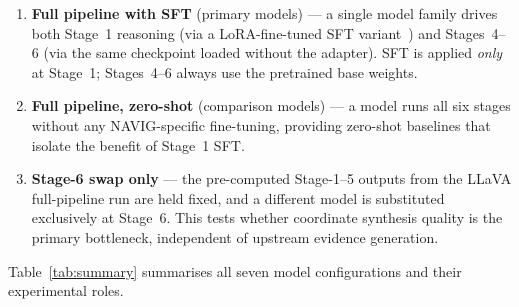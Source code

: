 \documentclass[11pt]{article}
\begin{document}
\begin{enumerate}[noitemsep]
  \item \textbf{Full pipeline with SFT} (primary models) --- a single model family drives
    both Stage~1 reasoning (via a LoRA-fine-tuned SFT variant~\citep{Hu2022LoRA}) and
    Stages~4--6 (via the same checkpoint loaded without the adapter). SFT is applied
    \emph{only} at Stage~1; Stages~4--6 always use the pretrained base weights.
  \item \textbf{Full pipeline, zero-shot} (comparison models) --- a model runs all six
    stages without any NAVIG-specific fine-tuning, providing zero-shot baselines that
    isolate the benefit of Stage~1 SFT.
  \item \textbf{Stage-6 swap only} --- the pre-computed Stage-1--5 outputs from the LLaVA
    full-pipeline run are held fixed, and a different model is substituted exclusively at
    Stage~6. This tests whether coordinate synthesis quality is the primary bottleneck,
    independent of upstream evidence generation.
\end{enumerate}

Table~\ref{tab:summary} summarises all seven model configurations and their experimental roles.
\end{document}
